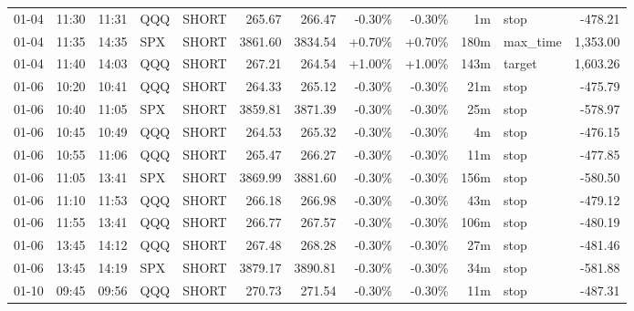 \documentclass[11pt,a4paper,twoside]{article}
\begin{document}
\begin{center}
\begin{longtable}{>{\color{txtmain}}l l l l l r r r r r >{\color{txtmain}}l r}
01-04 & 11:30 & 11:31 & QQQ & SHORT & 265.67 & 266.47 & \textcolor{lossred}{-0.30\%} & \textcolor{lossred}{-0.30\%} & 1m & stop & \textcolor{lossred}{-478.21} \\
01-04 & 11:35 & 14:35 & SPX & SHORT & 3861.60 & 3834.54 & \textcolor{wingreen}{+0.70\%} & \textcolor{wingreen}{+0.70\%} & 180m & max\_time & \textcolor{wingreen}{1,353.00} \\
01-04 & 11:40 & 14:03 & QQQ & SHORT & 267.21 & 264.54 & \textcolor{wingreen}{+1.00\%} & \textcolor{wingreen}{+1.00\%} & 143m & target & \textcolor{wingreen}{1,603.26} \\
01-06 & 10:20 & 10:41 & QQQ & SHORT & 264.33 & 265.12 & \textcolor{lossred}{-0.30\%} & \textcolor{lossred}{-0.30\%} & 21m & stop & \textcolor{lossred}{-475.79} \\
01-06 & 10:40 & 11:05 & SPX & SHORT & 3859.81 & 3871.39 & \textcolor{lossred}{-0.30\%} & \textcolor{lossred}{-0.30\%} & 25m & stop & \textcolor{lossred}{-578.97} \\
01-06 & 10:45 & 10:49 & QQQ & SHORT & 264.53 & 265.32 & \textcolor{lossred}{-0.30\%} & \textcolor{lossred}{-0.30\%} & 4m & stop & \textcolor{lossred}{-476.15} \\
01-06 & 10:55 & 11:06 & QQQ & SHORT & 265.47 & 266.27 & \textcolor{lossred}{-0.30\%} & \textcolor{lossred}{-0.30\%} & 11m & stop & \textcolor{lossred}{-477.85} \\
01-06 & 11:05 & 13:41 & SPX & SHORT & 3869.99 & 3881.60 & \textcolor{lossred}{-0.30\%} & \textcolor{lossred}{-0.30\%} & 156m & stop & \textcolor{lossred}{-580.50} \\
01-06 & 11:10 & 11:53 & QQQ & SHORT & 266.18 & 266.98 & \textcolor{lossred}{-0.30\%} & \textcolor{lossred}{-0.30\%} & 43m & stop & \textcolor{lossred}{-479.12} \\
01-06 & 11:55 & 13:41 & QQQ & SHORT & 266.77 & 267.57 & \textcolor{lossred}{-0.30\%} & \textcolor{lossred}{-0.30\%} & 106m & stop & \textcolor{lossred}{-480.19} \\
01-06 & 13:45 & 14:12 & QQQ & SHORT & 267.48 & 268.28 & \textcolor{lossred}{-0.30\%} & \textcolor{lossred}{-0.30\%} & 27m & stop & \textcolor{lossred}{-481.46} \\
01-06 & 13:45 & 14:19 & SPX & SHORT & 3879.17 & 3890.81 & \textcolor{lossred}{-0.30\%} & \textcolor{lossred}{-0.30\%} & 34m & stop & \textcolor{lossred}{-581.88} \\
01-10 & 09:45 & 09:56 & QQQ & SHORT & 270.73 & 271.54 & \textcolor{lossred}{-0.30\%} & \textcolor{lossred}{-0.30\%} & 11m & stop & \textcolor{lossred}{-487.31} \\

\end{longtable}
\end{center}
\end{document}
